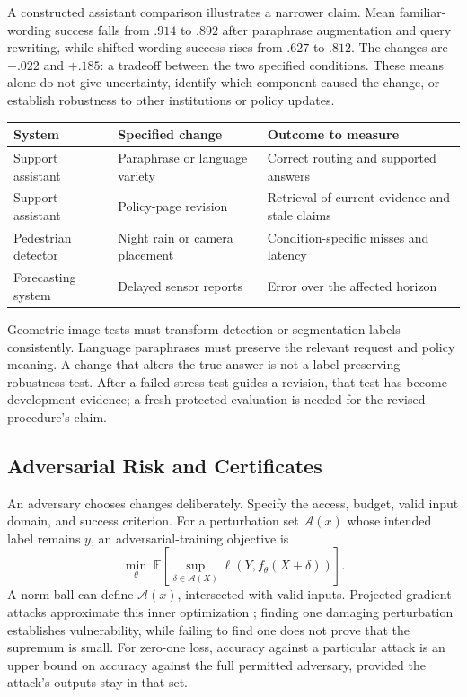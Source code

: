 A constructed assistant comparison illustrates a narrower claim. Mean familiar-wording success falls from $.914$ to $.892$ after paraphrase augmentation and query rewriting, while shifted-wording success rises from $.627$ to $.812$. The changes are $-.022$ and $+.185$: a tradeoff between the two specified conditions. These means alone do not give uncertainty, identify which component caused the change, or establish robustness to other institutions or policy updates.

\par\addvspace{\intextsep}\noindent\begin{minipage}{\linewidth}
\centering\small
\begin{tabular}{@{}L{2.4cm}L{3.3cm}L{4cm}@{}}
\toprule
System & Specified change & Outcome to measure \\
\midrule
Support assistant & Paraphrase or language variety & Correct routing and supported answers \\
Support assistant & Policy-page revision & Retrieval of current evidence and stale claims \\
Pedestrian detector & Night rain or camera placement & Condition-specific misses and latency \\
Forecasting system & Delayed sensor reports & Error over the affected horizon \\
\bottomrule
\end{tabular}
\label{tab:reliability-stress-tests}
\end{minipage}\par\addvspace{\intextsep}

Geometric image tests must transform detection or segmentation labels consistently. Language paraphrases must preserve the relevant request and policy meaning. A change that alters the true answer is not a label-preserving robustness test. After a failed stress test guides a revision, that test has become development evidence; a fresh protected evaluation is needed for the revised procedure's claim.

\subsection{Adversarial Risk and Certificates}

An adversary chooses changes deliberately. Specify the access, budget, valid input domain, and success criterion. For a perturbation set $\mathcal A(x)$ whose intended label remains $y$, an adversarial-training objective is
\[
\min_\theta\;\mathbb E\!\left[
\sup_{\delta\in\mathcal A(X)}
\ell(Y,f_\theta(X+\delta))\right].
\]
A norm ball can define $\mathcal A(x)$, intersected with valid inputs. Projected-gradient attacks approximate this inner optimization \citep{madry2018towards}; finding one damaging perturbation establishes vulnerability, while failing to find one does not prove that the supremum is small. For zero-one loss, accuracy against a particular attack is an upper bound on accuracy against the full permitted adversary, provided the attack's outputs stay in that set.

